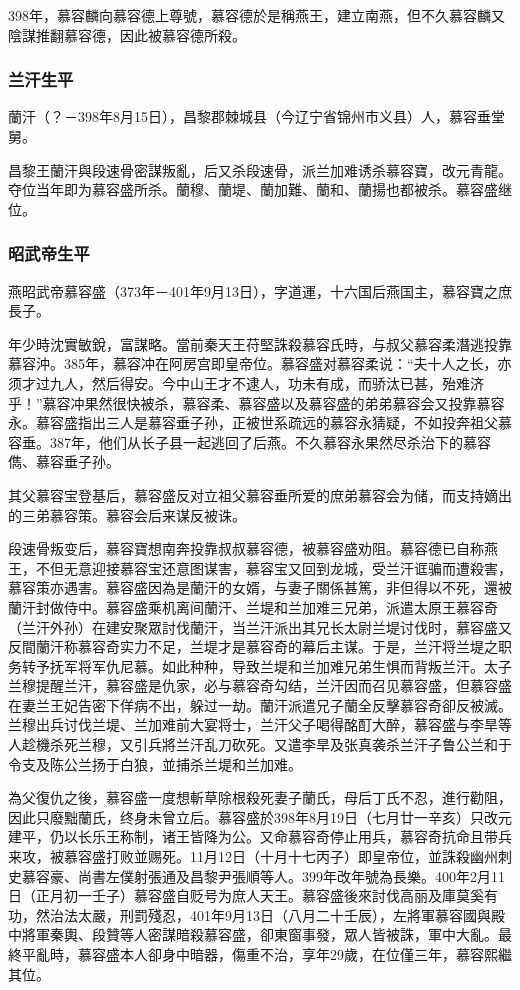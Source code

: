 398年，慕容麟向慕容德上尊號，慕容德於是稱燕王，建立南燕，但不久慕容麟又陰謀推翻慕容德，因此被慕容德所殺。

\subsubsection{兰汗生平}

蘭汗（？－398年8月15日），昌黎郡棘城县（今辽宁省锦州市义县）人，慕容垂堂舅。

昌黎王蘭汗與段速骨密謀叛亂，后又杀段速骨，派兰加难诱杀慕容寶，改元青龍。夺位当年即为慕容盛所杀。蘭穆、蘭堤、蘭加難、蘭和、蘭揚也都被杀。慕容盛继位。

\subsubsection{昭武帝生平}

燕昭武帝慕容盛（373年－401年9月13日），字道運，十六国后燕国主，慕容寶之庶長子。

年少時沈實敏銳，富謀略。當前秦天王苻堅誅殺慕容氏時，与叔父慕容柔潛逃投靠慕容沖。385年，慕容冲在阿房宫即皇帝位。慕容盛对慕容柔说：“夫十人之长，亦须才过九人，然后得安。今中山王才不逮人，功未有成，而骄汰已甚，殆难济乎！”慕容冲果然很快被杀，慕容柔、慕容盛以及慕容盛的弟弟慕容会又投靠慕容永。慕容盛指出三人是慕容垂子孙，正被世系疏远的慕容永猜疑，不如投奔祖父慕容垂。387年，他们从长子县一起逃回了后燕。不久慕容永果然尽杀治下的慕容儁、慕容垂子孙。

其父慕容宝登基后，慕容盛反对立祖父慕容垂所爱的庶弟慕容会为储，而支持嫡出的三弟慕容策。慕容会后来谋反被诛。

段速骨叛变后，慕容寶想南奔投靠叔叔慕容德，被慕容盛劝阻。慕容德已自称燕王，不但无意迎接慕容宝还意图谋害，慕容宝又回到龙城，受兰汗诓骗而遭殺害，慕容策亦遇害。慕容盛因為是蘭汗的女婿，与妻子關係甚篤，非但得以不死，還被蘭汗封做侍中。慕容盛乘机离间蘭汗、兰堤和兰加难三兄弟，派遣太原王慕容奇（兰汗外孙）在建安聚眾討伐蘭汗，当兰汗派出其兄长太尉兰堤讨伐时，慕容盛又反間蘭汗称慕容奇实力不足，兰堤才是慕容奇的幕后主谋。于是，兰汗将兰堤之职务转予抚军将军仇尼慕。如此种种，导致兰堤和兰加难兄弟生惧而背叛兰汗。太子兰穆提醒兰汗，慕容盛是仇家，必与慕容奇勾结，兰汗因而召见慕容盛，但慕容盛在妻兰王妃告密下佯病不出，躲过一劫。蘭汗派遣兄子蘭全反擊慕容奇卻反被滅。兰穆出兵讨伐兰堤、兰加难前大宴将士，兰汗父子喝得酩酊大醉，慕容盛与李旱等人趁機杀死兰穆，又引兵將兰汗乱刀砍死。又遣李旱及张真袭杀兰汗子鲁公兰和于令支及陈公兰扬于白狼，並捕杀兰堤和兰加难。

為父復仇之後，慕容盛一度想斬草除根殺死妻子蘭氏，母后丁氏不忍，進行勸阻，因此只廢黜蘭氏，终身未曾立后。慕容盛於398年8月19日（七月廿一辛亥）只改元建平，仍以长乐王称制，诸王皆降为公。又命慕容奇停止用兵，慕容奇抗命且带兵来攻，被慕容盛打败並赐死。11月12日（十月十七丙子）即皇帝位，並誅殺幽州刺史慕容豪、尚書左僕射張通及昌黎尹張順等人。399年改年號為長樂。400年2月11日（正月初一壬子）慕容盛自贬号为庶人天王。慕容盛後來討伐高丽及庫莫奚有功，然治法太嚴，刑罰殘忍，401年9月13日（八月二十壬辰），左將軍慕容國與殿中將軍秦輿、段贊等人密謀暗殺慕容盛，卻東窗事發，眾人皆被誅，軍中大亂。最終平亂時，慕容盛本人卻身中暗器，傷重不治，享年29歲，在位僅三年，慕容熙繼其位。

